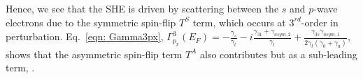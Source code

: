 \documentclass[letter,12pt,preprint,aps]{revtex4-1}
\begin{document}
Hence, we see that the SHE is driven by scattering between the $s$ and $p$-wave electrons due to the symmetric spin-flip $T^S$ term, which occurs at  $3^{rd}$-order in perturbation. Eq.~\ref{eqn: Gamma3px}, $\Gamma^3_{p_x}(E_F) =  - \frac{\gamma_{s}}{\gamma_t} - i \frac{\gamma_{31} + \gamma_{asym,2}}{\gamma_t} + \frac{\gamma_{3s} \gamma_{asym,1}}{2 \gamma_t (\gamma_0 + \gamma_a)} $, shows that the asymmetric spin-flip term $T^A$ also contributes but as a sub-leading term, .


\end{document}
